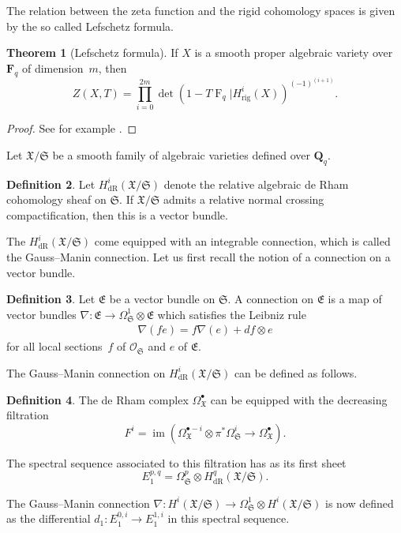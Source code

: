 \documentclass[a4paper,11pt]{article}
\numberwithin{equation}{section}
\newcommand{\QQ}{\mathbf{Q}} %
\newcommand{\FF}{\mathbf{F}} %
\DeclareMathOperator{\fIm}{im}       %
\DeclareMathOperator{\Frob}{F}           %
\providecommand{\HdR}{H_{\text{dR}}}    %
\providecommand{\Hrig}{H_{\text{rig}}}  %
\theoremstyle{definition}
\newtheorem{thm}{Theorem}[section]
\newtheorem{defn}[thm]{Definition}
\begin{document}
The relation between the zeta function and the rigid cohomology spaces 
is given by the so called Lefschetz formula.

\begin{thm}[Lefschetz formula] 
If $X$ is a smooth proper algebraic variety over $\FF_q$ of dimension~$m$, 
then \label{thm:Lefschetz}
\[
Z(X,T) = \prod_{i=0}^{2m} \det(1- T \Frob_q | \Hrig^i(X))^{(-1)^{(i+1)}}.
\]
\end{thm}

\begin{proof}
See for example \cite[Theorem 6.3]{EtesseLeStum1993}.
\end{proof}

Let $\mathfrak{X}/\mathfrak{S}$ be a smooth family of algebraic varieties 
defined over $\QQ_q$.

\begin{defn}
Let $\HdR^i(\mathfrak{X}/\mathfrak{S})$ denote the relative algebraic 
de Rham cohomology sheaf on $\mathfrak{S}$. 
If $\mathfrak{X}/\mathfrak{S}$ admits a relative normal crossing 
compactification, then this is a vector bundle.
\end{defn}

The $\HdR^i(\mathfrak{X}/\mathfrak{S})$ come equipped with an integrable 
connection, which is called the Gauss--Manin connection. Let us first recall 
the notion of a connection on a vector bundle.

\begin{defn}
Let $\mathfrak{E}$ be a vector bundle on $\mathfrak{S}$. A connection on 
$\mathfrak{E}$ is a map of vector bundles 
$\nabla: \mathfrak{E} \rightarrow \Omega^1_{\mathfrak{S}} \otimes \mathfrak{E}$
which satisfies the Leibniz rule
\begin{align*}
\nabla(f e)=f\nabla(e)+df \otimes e
\end{align*} 
for all local sections~$f$ of $\mathcal{O}_{\mathfrak{S}}$ and $e$ 
of $\mathfrak{E}$.
\end{defn}

The Gauss--Manin connection on $\HdR^i(\mathfrak{X}/\mathfrak{S})$ can 
be defined as follows.

\begin{defn}
The de Rham complex $\Omega^{\bullet}_{\mathfrak{X}}$ can be equipped 
with the decreasing filtration
\[
F^i=\fIm(\Omega^{\bullet-i}_{\mathfrak{X}} \otimes \pi^* \Omega^i_{\mathfrak{S}} \rightarrow \Omega^{\bullet}_{\mathfrak{X}}). 
\]

The spectral sequence associated to this filtration has as its first sheet 
\[
E_1^{p,q}=\Omega^p_{\mathfrak{S}} \otimes \HdR^q(\mathfrak{X}/\mathfrak{S}).
\]

The Gauss--Manin connection 
$\nabla:H^i(\mathfrak{X}/\mathfrak{S}) \rightarrow \Omega^1_{\mathfrak{S}} \otimes H^i(\mathfrak{X}/\mathfrak{S})$ 
is now defined as the differential $d_1: E_1^{0,i} \rightarrow E_1^{1,i}$ 
in this spectral sequence.
\end{defn}
\end{document}
